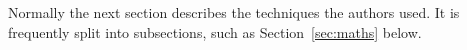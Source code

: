 \documentclass[fleqn,usenatbib]{mnras}
\newcommand{\tess}{{\it TESS}}
\newcommand{\kms}{km\,s$^{-1}$}
\newcommand{\masy}{mas\,yr$^{-1}$}
\newcommand{\mpl}{\mbox{$M_{p}$}}
\newcommand{\rpl}{\mbox{$R_{p}$}}
\newcommand{\mjup}{\mbox{$M_{\rm Jup}$}}
\newcommand{\rjup}{\mbox{$R_{\rm Jup}$}}
\newcommand{\Tstarra}{$12^{\rm h}40^{'}08.78^{"}$}
\newcommand{\Tstardec}{$-44^{\circ}18^{'}43.48^{"}$}
\newcommand{\TGAIAGmag}{$9.9103 \pm 0.0004$}
\newcommand{\TGAIAPMRA}{$-3.72 \pm 0.097$}
\newcommand{\TGAIAPMDec}{$-13.68 \pm 0.12$}
\newcommand{\TGAIAplx}{$9.38 \pm 0.06$}
\newcommand{\TESSTmag}{$9.4628 \pm 0.006$}
\newcommand{\APASSBmag}{$10.675 \pm 0.024$}
\newcommand{\APASSVmag}{$10.09 \pm 0.03$}
\newcommand{\MASSJ}{$8.903 \pm 0.037 $ }
\newcommand{\MASSH}{$8.594 \pm 0.063$ }
\newcommand{\MASSK}{$8.502 \pm 0.024$ }
\newcommand{\Ttzerozero}{ $ 1570.1^{+0.005}_{-0.004} $ }
\newcommand{\Tstar}{HD\,110113}
\newcommand{\Tplanet}{HD\,110113\,b}
\newcommand{\TGAIAid}{6133384959942131968}
\newcommand{\TICstar}{TIC-73228647}
\begin{document}
Normally the next section describes the techniques the authors used.
It is frequently split into subsections, such as Section~\ref{sec:maths} below.
%
\end{document}
